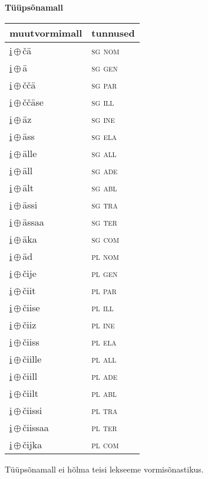 

\vspace{3.5em}
\noindent \begin{minipage}{\textwidth}
\noindent \textbf{Tüüpsõnamall \,}\\

\begin{sideways}
\begin{tabular}{l l}
muutvormimall & tunnused \\
\hline
\underline{i}\,$\oplus$\,čä & \textsc{ sg nom } \\
\underline{i}\,$\oplus$\,ä & \textsc{ sg gen } \\
\underline{i}\,$\oplus$\,ččä & \textsc{ sg par } \\
\underline{i}\,$\oplus$\,ččäse & \textsc{ sg ill } \\
\underline{i}\,$\oplus$\,äz & \textsc{ sg ine } \\
\underline{i}\,$\oplus$\,äss & \textsc{ sg ela } \\
\underline{i}\,$\oplus$\,älle & \textsc{ sg all } \\
\underline{i}\,$\oplus$\,äll & \textsc{ sg ade } \\
\underline{i}\,$\oplus$\,ält & \textsc{ sg abl } \\
\underline{i}\,$\oplus$\,ässi & \textsc{ sg tra } \\
\underline{i}\,$\oplus$\,ässaa & \textsc{ sg ter } \\
\underline{i}\,$\oplus$\,äka & \textsc{ sg com } \\
\underline{i}\,$\oplus$\,äd & \textsc{ pl nom } \\
\underline{i}\,$\oplus$\,čije & \textsc{ pl gen } \\
\underline{i}\,$\oplus$\,čiit & \textsc{ pl par } \\
\underline{i}\,$\oplus$\,čiise & \textsc{ pl ill } \\
\underline{i}\,$\oplus$\,čiiz & \textsc{ pl ine } \\
\underline{i}\,$\oplus$\,čiiss & \textsc{ pl ela } \\
\underline{i}\,$\oplus$\,čiille & \textsc{ pl all } \\
\underline{i}\,$\oplus$\,čiill & \textsc{ pl ade } \\
\underline{i}\,$\oplus$\,čiilt & \textsc{ pl abl } \\
\underline{i}\,$\oplus$\,čiissi & \textsc{ pl tra } \\
\underline{i}\,$\oplus$\,čiissaa & \textsc{ pl ter } \\
\underline{i}\,$\oplus$\,čijka & \textsc{ pl com } \\
\end{tabular}
\end{sideways}
\label{tab:tüüpsõnamall-ičä}

\end{minipage}

 
\vspace{1em}
\noindent Tüüpsõnamall  ei hõlma teisi lekseeme vormi\-sõnastikus.
